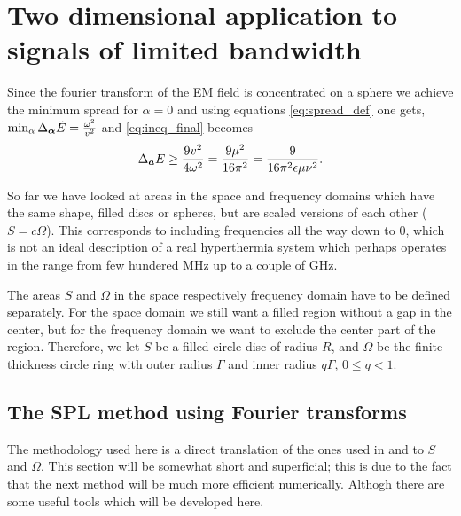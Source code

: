 \documentclass[11pt,a4paper, 
swedish,english %
]{article}
\begin{document}
\section{Two dimensional application to
 signals of limited bandwidth}
Since the fourier transform of the EM field is concentrated on a sphere we achieve the minimum spread for $\alpha=0$ and using equations \eqref{eq:spread_def} one gets,
$\min_\alpha\Delta_{\vb*\alpha}\tilde{E}=\frac{\omega^2}{v^2}$ and \eqref{eq:ineq_final} becomes
\begin{equation}
 \Delta_{\vb*a}E\geq \frac{9v^2}{4\omega^2}=\frac{9\mu^2}{16\pi^2}=\frac{9}{16\pi^2\epsilon\mu\nu^2}.
 \end{equation}

So far we have looked at areas in the space and frequency domains
which have the same shape, filled discs or spheres, but are scaled
versions of each other ($S=c\Omega$). This corresponds to
including frequencies all the way down to 0, which is not an ideal
description of a real hyperthermia system which perhaps operates in the
range from few hundered MHz up to a couple of GHz.

The areas $S$ and $\Omega$ in the space respectively frequency domain have to
be defined separately.
For the space domain we still want a
filled region without a gap in the center, but for the frequency domain
we want to exclude the center part of the region.
Therefore, we let $S$ be a filled
circle disc of radius $R$, and $\Omega$ be the finite thickness circle
ring with outer radius $\Gamma$ and inner radius $q\Gamma$, $0\le q<1$.


\subsection{The SPL method using Fourier transforms}
The methodology used here is a direct translation of the ones used in
\cite{PSWF-I_1961} and \cite{PSWF-IV_1964} to $S$ and $\Omega$. This
section will be somewhat short and superficial; this is due to the
fact that the next method will be much more efficient
numerically. Althogh there are some useful tools which will be
developed here.
\end{document}
